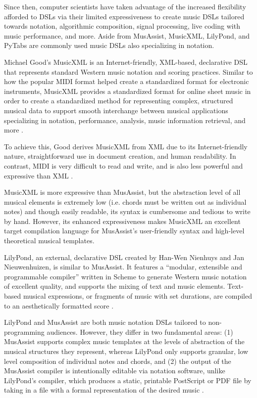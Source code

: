 \documentclass{article}
\begin{document}
Since then, computer scientists have taken advantage of the increased flexibility afforded to DSLs via their limited expressiveness to create music DSLs tailored towards notation, algorithmic composition, signal processing, live coding with music performance, and more. Aside from MusAssist, MusicXML, LilyPond, and PyTabs are commonly used music DSLs also specializing in notation.

Michael Good’s MusicXML is an Internet-friendly, XML-based, declarative DSL that represents standard Western music notation and scoring practices. Similar to how the popular MIDI format helped create a standardized format for electronic instruments, MusicXML provides a standardized format for online sheet music in order to create a standardized method for representing complex, structured musical data to support smooth interchange between musical applications specializing in notation, performance, analysis, music information retrieval, and more \cite{good_2013}.

To achieve this, Good derives MusicXML from XML due to its Internet-friendly nature, straightforward use in document creation, and human readability. In contrast, MIDI is very difficult to read and write, and is also less powerful and expressive than XML \cite{good_2001}.

MusicXML is more expressive than MusAssist, but the abstraction level of all musical elements is extremely low (i.e. chords must be written out as individual notes) and though easily readable, its syntax is cumbersome and tedious to write by hand. However, its enhanced expressiveness makes MusicXML an excellent target compilation language for MusAssist’s user-friendly syntax and high-level theoretical musical templates.

LilyPond, an external, declarative DSL created by Han-Wen Nienhuys and Jan Nieuwenhuizen, is similar to MusAssist. It features a “modular, extensible and programmable compiler” written in Scheme to generate Western music notation of excellent quality, and supports the mixing of text and music elements. Text-based musical expressions, or fragments of music with set durations, are compiled to an aesthetically formatted score \cite{nienhuys_nieuwenhuizen_2003}.

LilyPond and MusAssist are both music notation DSLs tailored to non-programming audiences. However, they differ in two fundamental areas: (1) MusAssist supports complex music templates at the levels of abstraction of the musical structures they represent, whereas LilyPond only supports granular, low level composition of individual notes and chords, and (2) the output of the MusAssist compiler is intentionally editable via notation software, unlike LilyPond’s compiler, which produces a static, printable PostScript or PDF file by taking in a file with a formal representation of the desired music 
\cite{nienhuys_nieuwenhuizen_2003}.
\end{document}
